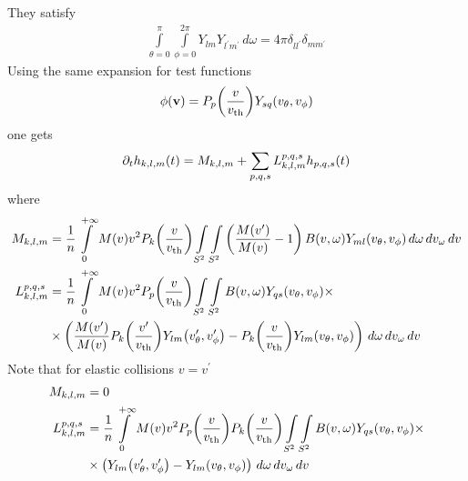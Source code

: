 \documentclass[10pt,letterpaper]{article}
\newcommand{\myint}[2]{\int\limits_{#1}^{#2}}
\newcommand{\diff}[1]{\, d#1}
\newcommand{\vect}[1]{\mathbf{#1}}
\newcommand{\of}[1]{\mleft( #1 \mright)}
\newcommand{\ddt}[1]{\partial_t #1}
\newcommand{\vth}{v_\textrm{th}}
\begin{document}
They satisfy
\begin{align*}
\myint{\theta=0}{\pi}\myint{\phi=0}{2\pi} 
Y_{lm} Y_{l^\prime m^\prime} \diff{\omega}
= 4 \pi \delta_{ll^\prime} \delta_{mm^\prime}
\end{align*}
Using the same expansion for test functions
\begin{align*}
\phi\of{\vect{v}} = P_{p}\of{\frac{v}{\vth}} Y_{s q} \of{v_\theta, v_\phi}
\end{align*}
one gets 
\begin{align*}
\ddt{h_{k,l,m}\of{t}} = 
M_{k,l,m} + 
\sum_{p,q,s} L_{k,l,m}^{p,q,s}h_{p,q,s}\of{t}
\end{align*}
where
\begin{align*}
M_{k,l,m} &= 
\frac{1}{n}
\myint{0}{+\infty}
M\of{v}
v^2
P_{k}\of{\frac{v}{\vth}}
\myint{S^2}{}
\myint{S^2}{}
\left( \frac{M\of{v^\prime}}{M\of{v}} - 1 \right) 
B\of{v,\omega}  Y_{m l} \of{v_\theta, v_\phi}
\diff{\omega}
\diff{v_\omega}
\diff{v}
\\
{L}_{k,l,m}^{p,q,s} &=
\frac{1}{n}
\myint{0}{+\infty} 
M\of{v}
v^2
P_p \of{\frac{v}{\vth}} 
\myint{S^2}{}
\myint{S^2}{}
B\of{v,\omega} Y_{qs}\of{v_\theta, v_\phi} 
 \times
\\
& \times
\left(
\frac{M\of{v^\prime}}{M\of{v}} P_k\of{\frac{v^\prime}{\vth}} Y_{lm}\of{v_\theta^\prime, v_\phi^\prime}
-
P_k\of{\frac{v}{\vth}} Y_{lm}\of{v_\theta, v_\phi}
\right)
\diff{\omega}
\diff{v_\omega}
\diff{v} 
\end{align*}
Note that for elastic collisions $v=v^\prime$
\begin{align*}
M_{k,l,m} &= 0
\\
{L}_{k,l,m}^{p,q,s} &=
\frac{1}{n}
\myint{0}{+\infty} 
M\of{v}
v^2
P_p \of{\frac{v}{\vth}}
P_k \of{\frac{v}{\vth}} 
\myint{S^2}{}
\myint{S^2}{}
B\of{v,\omega} Y_{qs}\of{v_\theta, v_\phi} 
 \times
\\
& \times
\left(
Y_{lm}\of{v_\theta^\prime, v_\phi^\prime}
-
Y_{lm}\of{v_\theta, v_\phi}
\right)
\diff{\omega}
\diff{v_\omega}
\diff{v} 
\end{align*}
\end{document}
